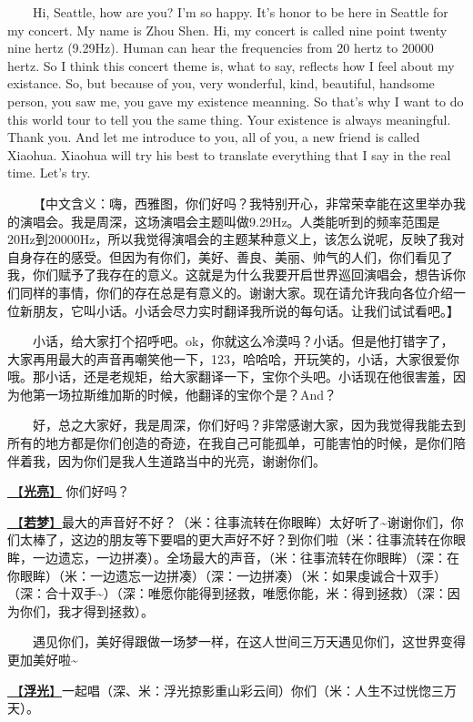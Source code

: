 \documentclass[]{ctexbook}
\begin{document}
  Hi, Seattle, how are you? I'm so happy. It's honor to be here in Seattle for my concert. My name is Zhou Shen. Hi, my concert is called nine point twenty nine hertz (9.29Hz). Human can hear the frequencies from 20 hertz to 20000 hertz. So I think this concert theme is, what to say, reflects how I feel about my existance. So, but because of you, very wonderful, kind, beautiful, handsome person, you saw me, you gave my existence meanning. So that's why I want to do this world tour to tell you the same thing. Your existence is always meaningful. Thank you. And let me introduce to you, all of you, a new friend is called Xiaohua. Xiaohua will try his best to translate everything that I say in the real time. Let's try.

  【中文含义：嗨，西雅图，你们好吗？我特别开心，非常荣幸能在这里举办我的演唱会。我是周深，这场演唱会主题叫做9.29Hz。人类能听到的频率范围是20Hz到20000Hz，所以我觉得演唱会的主题某种意义上，该怎么说呢，反映了我对自身存在的感受。但因为有你们，美好、善良、美丽、帅气的人们，你们看见了我，你们赋予了我存在的意义。这就是为什么我要开启世界巡回演唱会，想告诉你们同样的事情，你们的存在总是有意义的。谢谢大家。现在请允许我向各位介绍一位新朋友，它叫小话。小话会尽力实时翻译我所说的每句话。让我们试试看吧。】

  小话，给大家打个招呼吧。ok，你就这么冷漠吗？小话。但是他打错字了，大家再用最大的声音再嘲笑他一下，123，哈哈哈，开玩笑的，小话，大家很爱你哦。那小话，还是老规矩，给大家翻译一下，宝你个头吧。小话现在他很害羞，因为他第一场拉斯维加斯的时候，他翻译的宝你个是？And？

  好，总之大家好，我是周深，你们好吗？非常感谢大家，因为我觉得我能去到所有的地方都是你们创造的奇迹，在我自己可能孤单，可能害怕的时候，是你们陪伴着我，因为你们是我人生道路当中的光亮，谢谢你们。

\hyperref[silver-linings]{🎵【\textbf{光亮}】} 你们好吗？

\hyperref[ruomeng]{🎵【\textbf{若梦}】}最大的声音好不好？（米：往事流转在你眼眸）太好听了\textasciitilde 谢谢你们，你们太棒了，这边的朋友等下要唱的更大声好不好？到你们啦（米：往事流转在你眼眸，一边遗忘，一边拼凑）。全场最大的声音，（米：往事流转在你眼眸）（深：在你眼眸）（米：一边遗忘一边拼凑）（深：一边拼凑）（米：如果虔诚合十双手）（深：合十双手\textasciitilde）（深：唯愿你能得到拯救，唯愿你能，米：得到拯救）（深：因为你们，我才得到拯救）。

  遇见你们，美好得跟做一场梦一样，在这人世间三万天遇见你们，这世界变得更加美好啦\textasciitilde{}

\hyperref[floating-light]{🎵【\textbf{浮光}】}一起唱（深、米：浮光掠影重山彩云间）你们（米：人生不过恍惚三万天）。
\end{document}
